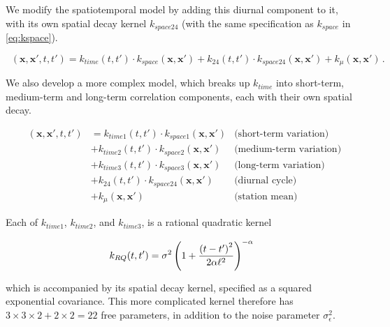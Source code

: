 \documentclass[letter]{article}
\newcommand{\genericdel}[3]{%
      \left#1#3\right#2
    }
\newcommand{\del}[1]{\genericdel(){#1}}
\newcommand{\xvec}{\mathbold{x}}
\newcommand{\sigman}{\sigma_{\epsilon}}
\DeclareMathOperator{\kdiurn}{k_{\mathtt{SESE_24}}}
\DeclareMathOperator{\ksumprod}{k_{\mathtt{sumprod}}}
\begin{document}
We modify the spatiotemporal model by adding this diurnal component to
it, with its own spatial decay kernel \(k_{space24}\) (with the same
specification as \(k_{space}\) in \eqref{eq:kspace}).

\begin{equation}
    \kdiurn(\xvec,\xvec',t,t') = k_{time}(t,t') \cdot k_{space}(\xvec, \xvec') 
        + k_{24}(t,t') \cdot k_{space24}(\xvec, \xvec')
        + k_\mu(\xvec, \xvec') 
        \,.
\end{equation}
    


    	We also develop a more complex model, which breaks up \(k_{time}\) into
short-term, medium-term and long-term correlation components, each with
their own spatial decay.

\begin{equation}
\begin{aligned}
    \ksumprod(\xvec,\xvec',t,t') &= 
           k_{time1}(t,t') \cdot k_{space1}(\xvec, \xvec')  &\text{(short-term variation)} \\
        &+ k_{time2}(t,t') \cdot k_{space2}(\xvec, \xvec')  &\text{(medium-term variation)} \\
        &+ k_{time3}(t,t') \cdot k_{space3}(\xvec, \xvec')  &\text{(long-term variation)} \\
        &+ k_{24}(t,t') \cdot k_{space24}(\xvec, \xvec') &\text{(diurnal cycle)} \\
        &+ k_\mu(\xvec, \xvec') &\text{(station mean)}
\end{aligned}
\end{equation}

Each of \(k_{time1}\), \(k_{time2}\), and \(k_{time3}\), is a rational
quadratic kernel

\begin{equation}
    k_{RQ}(t,t') = \sigma^2 \del{1 + \frac{\del{t-t'}^2}{2\alpha\ell^2} }^{-\alpha}
\end{equation}

which is accompanied by its spatial decay kernel, specified as a squared
exponential covariance. This more complicated kernel therefore has
\(3 \times 3 \times 2 + 2 \times 2 = 22\) free parameters, in addition
to the noise parameter \(\sigman^2\).
\end{document}
